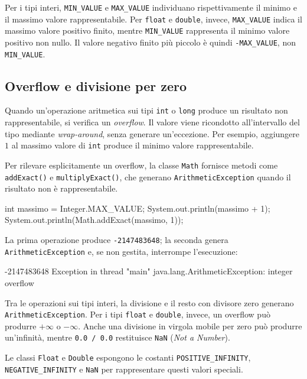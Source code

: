 Per i tipi interi, \texttt{MIN\_VALUE} e
\texttt{MAX\_VALUE} individuano rispettivamente il minimo
e il massimo valore rappresentabile. Per \texttt{float}
e \texttt{double}, invece, \texttt{MAX\_VALUE} indica
il massimo valore positivo finito, mentre
\texttt{MIN\_VALUE} rappresenta il minimo valore positivo
non nullo. Il valore negativo finito più piccolo è quindi
\texttt{-MAX\_VALUE}, non \texttt{MIN\_VALUE}.

\clearpage

\subsection{Overflow e divisione per zero}
\label{sec:fi-java-overflow}

Quando un'operazione aritmetica sui tipi \texttt{int} o
\texttt{long} produce un risultato non rappresentabile,
si verifica un \emph{overflow}. Il valore viene ricondotto
all'intervallo del tipo mediante \emph{wrap-around}, senza
generare un'eccezione. Per esempio, aggiungere \(1\) al
massimo valore di \texttt{int} produce il minimo valore
rappresentabile.

Per rilevare esplicitamente un overflow, la classe
\texttt{Math} fornisce metodi come \texttt{addExact()}
e \texttt{multiplyExact()}, che generano
\texttt{ArithmeticException} quando il risultato
non è rappresentabile.

\begin{unipdcode}[language=Java]
int massimo = Integer.MAX_VALUE;
System.out.println(massimo + 1);
System.out.println(Math.addExact(massimo, 1));
\end{unipdcode}

La prima operazione produce \texttt{-2147483648}; la seconda
genera \texttt{ArithmeticException} e, se non gestita,
interrompe l'esecuzione:

\begin{unipdterminal}
-2147483648
Exception in thread "main" java.lang.ArithmeticException: integer overflow
\end{unipdterminal}

Tra le operazioni sui tipi interi, la divisione e il resto
con divisore zero generano \texttt{ArithmeticException}.
Per i tipi \texttt{float} e \texttt{double}, invece,
un overflow può produrre \(+\infty\) o \(-\infty\).
Anche una divisione in virgola mobile per zero può produrre
un'infinità, mentre \texttt{0.0 / 0.0} restituisce
\texttt{NaN} (\emph{Not a Number}).

Le classi \texttt{Float} e \texttt{Double} espongono
le costanti \texttt{POSITIVE\_INFINITY},
\texttt{NEGATIVE\_INFINITY} e \texttt{NaN}
per rappresentare questi valori speciali.

